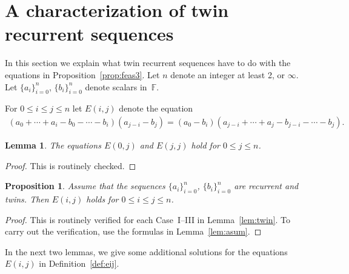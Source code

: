 \documentclass[pdftex]{sigma}
\numberwithin{equation}{section}
\newtheorem{Lemma}[Theorem]{Lemma}
\newtheorem{Proposition}[Theorem]{Proposition}
\begin{document}
\section{A characterization of twin recurrent sequences}\label{section11}

In this section we explain what twin recurrent
sequences have to do with the equations in
Proposition~\ref{prop:feas3}.
Let $n$ denote an integer at least 2, or $\infty$.
Let $\lbrace a_i \rbrace_{i=0}^n$,
 $\lbrace b_i \rbrace_{i=0}^n$ denote scalars in~$\mathbb F$.

\begin{Definition}\label{def:eij}
For $0 \leq i\leq j\leq n$ let $E(i,j)$ denote the equation
\begin{gather*}
(a_0+ \cdots + a_i -b_0-\cdots - b_i)
(a_{j-i}-b_j)
=
(a_{0}-b_i)(a_{j-i}+ \cdots + a_j -b_{j-i}-\cdots - b_j).
\end{gather*}
\end{Definition}
\begin{Lemma}\label{lem:triv}
The equations $E(0,j)$ and $E(j,j)$ hold for $0 \leq j \leq n$.
\end{Lemma}
\begin{proof} This is routinely checked.
\end{proof}

\begin{Proposition}\label{lem:betaGam}
Assume that the sequences $\lbrace a_i \rbrace_{i=0}^{n}$, $\lbrace b_i \rbrace_{i=0}^{n}$ are recurrent and twins.
Then $E(i,j)$ holds for $0 \leq i\leq j \leq n$.
\end{Proposition}
\begin{proof}This is routinely verified for each Case~I--III in Lemma~\ref{lem:twin}. To carry out the verification, use the
formulas in Lemma~\ref{lem:asum}.
\end{proof}

In the next two lemmas, we give some additional
solutions for the equations $E(i,j)$ in Definition~\ref{def:eij}.
\end{document}
